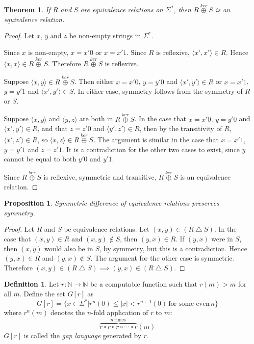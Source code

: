 \documentclass{article}
\newtheorem{theorem}{Theorem}[section]
\newtheorem{proposition}[proposition]{Proposition}
\theoremstyle{definition} \newtheorem{definition}[definition]{Definition}
\newcommand{\plain}[1]{\,\text{#1}\,} %
\newcommand{\kj}{\overset{ker}{\oplus}} %
\newcommand{\symdiff}{\bigtriangleup} %
\newcommand{\defn}[1]{\emph{#1}} %
\newcommand{\pair}[2]{\langle#1,#2\rangle} %
\begin{document}
\begin{theorem}
  If $R$ and $S$ are equivalence relations on $\Sigma^*$, then $R\kj S$ is an equivalence relation.
\end{theorem}
\begin{proof}
  Let $x$, $y$ and $z$ be non-empty strings in $\Sigma^*$.
  
  Since $x$ is non-empty, $x=x'0$ or $x=x'1$.
  Since $R$ is reflexive, $\pair{x'}{x'}\in R$.
  Hence $\pair{x}{x}\in R\kj S$.
  Therefore $R\kj S$ is reflexive.
  
  Suppose $\pair{x}{y}\in R\kj S$.
  Then either $x=x'0$, $y=y'0$ and $\pair{x'}{y'}\in R$ or $x=x'1$, $y=y'1$ and $\pair{x'}{y'}\in S$.
  In either case, symmetry follows from the symmetry of $R$ or $S$.

  Suppose $\pair{x}{y}$ and $\pair{y}{z}$ are both in $R\kj S$.
  In the case that $x=x'0$, $y=y'0$ and $\pair{x'}{y'}\in R$, and that $z=z'0$ and $\pair{y'}{z'}\in R$, then by the transitivity of $R$, $\pair{x'}{z'}\in R$, so $\pair{x}{z}\in R\kj S$.
  The argument is similar in the case that $x=x'1$, $y=y'1$ and $z=z'1$.
  It is a contradiction for the other two cases to exist, since $y$ cannot be equal to both $y'0$ and $y'1$.

  Since $R\kj S$ is reflexive, symmetric and transitive, $R\kj S$ is an equivalence relation.
\end{proof}

\begin{proposition}\label{prop:symdiff}
  Symmetric difference of equivalence relations preserves symmetry.
\end{proposition}
\begin{proof}
  Let $R$ and $S$ be equivalence relations.
  Let $(x,y)\in(R\symdiff S)$.
  In the case that $(x,y)\in R$ and $(x,y)\notin S$, then $(y,x)\in R$.
  If $(y,x)$ were in $S$, then $(x,y)$ would also be in $S$, by symmetry, but this is a contradiction.
  Hence $(y,x)\in R$ and $(y,x)\notin S$.
  The argument for the other case is symmetric.
  Therefore $(x,y)\in(R\symdiff S)\implies (y,x)\in(R\symdiff S)$.
\end{proof}

\begin{definition}
  Let $r\colon\mathbb{N}\to\mathbb{N}$ be a computable function such that $r(m)>m$ for all $m$.
  Define the set $G[r]$ as
  \begin{displaymath}
    G[r]=\{x\in\Sigma^*|r^n(0)\leq|x|<r^{n+1}(0) \plain{for some even} n\}
  \end{displaymath}
  where $r^n(m)$ denotes the $n$-fold application of $r$ to $m$:
  \begin{displaymath}
    \overbrace{r\circ r\circ r\circ\cdots\circ r}^{n \plain{times}}(m)
  \end{displaymath}
  $G[r]$ is called the \defn{gap language} generated by $r$.
\end{definition}
\end{document}
